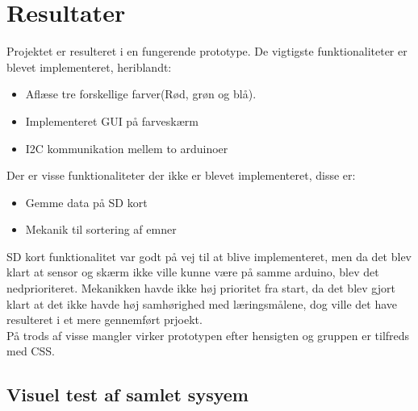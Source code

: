 \graphicspath{{Chapters/CSS_test/}}

\section{Resultater}
Projektet er resulteret i en fungerende prototype. De vigtigste funktionaliteter er blevet implementeret, heriblandt:

\begin{itemize}
	\item Aflæse tre forskellige farver(Rød, grøn og blå).
	
	\item Implementeret GUI på farveskærm
	
	\item I2C kommunikation mellem to arduinoer
	
\end{itemize}

Der er visse funktionaliteter der ikke er blevet implementeret, disse er:

\begin{itemize}
	\item Gemme data på SD kort
	
	\item Mekanik til sortering af emner

\end{itemize}

SD kort funktionalitet var godt på vej til at blive implementeret, men da det blev klart at sensor og skærm ikke ville kunne være på samme arduino, blev det nedprioriteret. Mekanikken havde ikke høj prioritet fra start, da det blev gjort klart at det ikke havde høj samhørighed med læringsmålene, dog ville det have resulteret i et mere gennemført prjoekt.
\\
På trods af visse mangler virker prototypen efter hensigten og gruppen er tilfreds med CSS.

\subsection{Visuel test af samlet sysyem}

